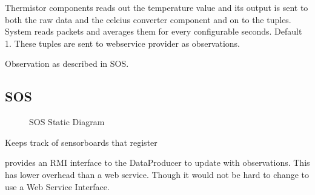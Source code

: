 \documentclass[]{final_report}
\begin{document}
Thermistor components reads out the temperature value
and its output is sent to both the raw data and the celcius
converter component and on to the tuples. System reads packets
and averages them for every configurable seconds. Default 1.
These tuples are sent to webservice provider as observations.

Observation as described in SOS.

\newpage
\subsection {SOS}
 \begin{figure}[h!]
\caption{SOS Static Diagram}\label{fig:bon_static_diagam_provider.png}
\end{figure}
Keeps track of sensorboards that register

provides an RMI interface to the DataProducer to update with observations. This has lower overhead
than a web service. Though it would not be hard to change to use a Web Service Interface.
\end{document}
